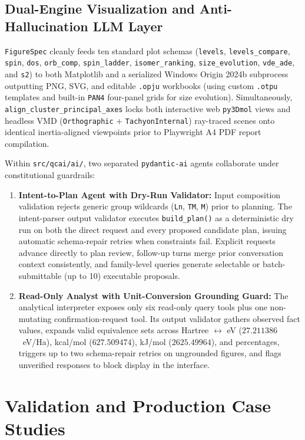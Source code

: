 \documentclass[journal=jcisd8,manuscript=article]{achemso}
\begin{document}
\subsection{Dual-Engine Visualization and Anti-Hallucination LLM Layer}

\texttt{FigureSpec} cleanly feeds ten standard plot schemas (\texttt{levels}, \texttt{levels\_compare}, \texttt{spin}, \texttt{dos}, \texttt{orb\_comp}, \texttt{spin\_ladder}, \texttt{isomer\_ranking}, \texttt{size\_evolution}, \texttt{vde\_ade}, and \texttt{s2}) to both Matplotlib and a serialized Windows Origin 2024b subprocess outputting PNG, SVG, and editable \texttt{.opju} workbooks (using custom \texttt{.otpu} templates and built-in \texttt{PAN4} four-panel grids for size evolution). Simultaneously, \texttt{align\_cluster\_principal\_axes} locks both interactive web \texttt{py3Dmol} views and headless VMD (\texttt{Orthographic} + \texttt{TachyonInternal}) ray-traced scenes onto identical inertia-aligned viewpoints prior to Playwright A4 PDF report compilation.

Within \texttt{src/qcai/ai/}, two separated \texttt{pydantic-ai} agents collaborate under constitutional guardrails:
\begin{enumerate}
  \item \textbf{Intent-to-Plan Agent with Dry-Run Validator:} Input composition validation rejects generic group wildcards (\texttt{Ln}, \texttt{TM}, \texttt{M}) prior to planning. The intent-parser output validator executes \texttt{build\_plan()} as a deterministic dry run on both the direct request and every proposed candidate plan, issuing automatic schema-repair retries when constraints fail. Explicit requests advance directly to plan review, follow-up turns merge prior conversation context consistently, and family-level queries generate selectable or batch-submittable (up to 10) executable proposals.
  \item \textbf{Read-Only Analyst with Unit-Conversion Grounding Guard:} The analytical interpreter exposes only six read-only query tools plus one non-mutating confirmation-request tool. Its output validator gathers observed fact values, expands valid equivalence sets across Hartree $\leftrightarrow$ eV ($27.211386$~eV/Ha), kcal/mol ($627.509474$), kJ/mol ($2625.49964$), and percentages, triggers up to two schema-repair retries on ungrounded figures, and flags unverified responses to block display in the interface.
\end{enumerate}

\section{Validation and Production Case Studies}
\end{document}
